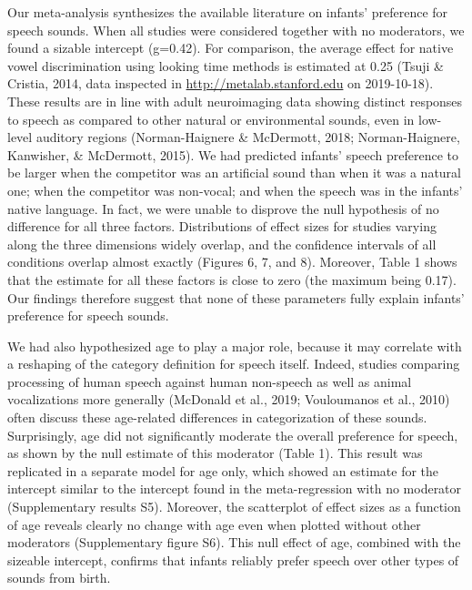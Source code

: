 \documentclass[man]{apa6}
\begin{document}
Our meta-analysis synthesizes the available literature on infants'
preference for speech sounds. When all studies were considered together
with no moderators, we found a sizable intercept (g=0.42). For
comparison, the average effect for native vowel discrimination using
looking time methods is estimated at 0.25 (Tsuji \& Cristia, 2014, data
inspected in \url{http://metalab.stanford.edu} on 2019-10-18). These
results are in line with adult neuroimaging data showing distinct
responses to speech as compared to other natural or environmental
sounds, even in low-level auditory regions (Norman-Haignere \&
McDermott, 2018; Norman-Haignere, Kanwisher, \& McDermott, 2015). We had
predicted infants' speech preference to be larger when the competitor
was an artificial sound than when it was a natural one; when the
competitor was non-vocal; and when the speech was in the infants' native
language. In fact, we were unable to disprove the null hypothesis of no
difference for all three factors. Distributions of effect sizes for
studies varying along the three dimensions widely overlap, and the
confidence intervals of all conditions overlap almost exactly (Figures
6, 7, and 8). Moreover, Table 1 shows that the estimate for all these
factors is close to zero (the maximum being 0.17). Our findings
therefore suggest that none of these parameters fully explain infants'
preference for speech sounds.

We had also hypothesized age to play a major role, because it may
correlate with a reshaping of the category definition for speech itself.
Indeed, studies comparing processing of human speech against human
non-speech as well as animal vocalizations more generally (McDonald et
al., 2019; Vouloumanos et al., 2010) often discuss these age-related
differences in categorization of these sounds. Surprisingly, age did not
significantly moderate the overall preference for speech, as shown by
the null estimate of this moderator (Table 1). This result was
replicated in a separate model for age only, which showed an estimate
for the intercept similar to the intercept found in the meta-regression
with no moderator (Supplementary results S5). Moreover, the scatterplot
of effect sizes as a function of age reveals clearly no change with age
even when plotted without other moderators (Supplementary figure S6).
This null effect of age, combined with the sizeable intercept, confirms
that infants reliably prefer speech over other types of sounds from
birth.
\end{document}

